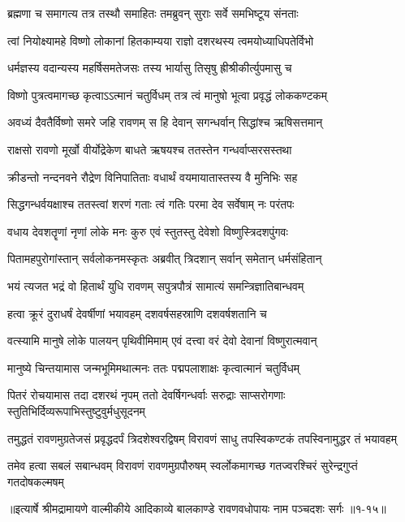 \twolineshloka
{ब्रह्मणा च समागत्य तत्र तस्थौ समाहितः}
{तमब्रुवन् सुराः सर्वे समभिष्टूय संनताः} %

\twolineshloka
{त्वां नियोक्ष्यामहे विष्णो लोकानां हितकाम्यया}
{राज्ञो दशरथस्य त्वमयोध्याधिपतेर्विभो} %

\twolineshloka
{धर्मज्ञस्य वदान्यस्य महर्षिसमतेजसः}
{तस्य भार्यासु तिसृषु ह्रीश्रीकीर्त्युपमासु च} %

\twolineshloka
{विष्णो पुत्रत्वमागच्छ कृत्वाऽऽत्मानं चतुर्विधम्}
{तत्र त्वं मानुषो भूत्वा प्रवृद्धं लोककण्टकम्} %

\twolineshloka
{अवध्यं दैवतैर्विष्णो समरे जहि रावणम्}
{स हि देवान् सगन्धर्वान् सिद्धांश्च ऋषिसत्तमान्} %

\twolineshloka
{राक्षसो रावणो मूर्खो वीर्योद्रेकेण बाधते}
{ऋषयश्च ततस्तेन गन्धर्वाप्सरसस्तथा} %

\twolineshloka
{क्रीडन्तो नन्दनवने रौद्रेण विनिपातिताः}
{वधार्थं वयमायातास्तस्य वै मुनिभिः सह} %

\twolineshloka
{सिद्धगन्धर्वयक्षाश्च ततस्त्वां शरणं गताः}
{त्वं गतिः परमा देव सर्वेषाम् नः परंतपः} %

\twolineshloka
{वधाय देवशतॄणां नृणां लोके मनः कुरु}
{एवं स्तुतस्तु देवेशो विष्णुस्त्रिदशपुंगवः} %

\twolineshloka
{पितामहपुरोगांस्तान् सर्वलोकनमस्कृतः}
{अब्रवीत् त्रिदशान् सर्वान् समेतान् धर्मसंहितान्} %

\twolineshloka
{भयं त्यजत भद्रं वो हितार्थं युधि रावणम्}
{सपुत्रपौत्रं सामात्यं समन्त्रिज्ञातिबान्धवम्} %

\twolineshloka
{हत्वा क्रूरं दुराधर्षं देवर्षीणां भयावहम्}
{दशवर्षसहस्राणि दशवर्षशतानि च} %

\twolineshloka
{वत्स्यामि मानुषे लोके पालयन् पृथिवीमिमाम्}
{एवं दत्त्वा वरं देवो देवानां विष्णुरात्मवान्} %

\twolineshloka
{मानुष्ये चिन्तयामास जन्मभूमिमथात्मनः}
{ततः पद्मपलाशाक्षः कृत्वात्मानं चतुर्विधम्} %

\threelineshloka
{पितरं रोचयामास तदा दशरथं नृपम्}
{ततो देवर्षिगन्धर्वाः सरुद्राः साप्सरोगणाः}
{स्तुतिभिर्दिव्यरूपाभिस्तुष्टुवुर्मधुसूदनम्} %

\twolineshloka
{तमुद्धतं रावणमुग्रतेजसं प्रवृद्धदर्पं त्रिदशेश्वरद्विषम्}
{विरावणं साधु तपस्विकण्टकं तपस्विनामुद्धर तं भयावहम्} %

\twolineshloka
{तमेव हत्वा सबलं सबान्धवम् विरावणं रावणमुग्रपौरुषम्}
{स्वर्लोकमागच्छ गतज्वरश्चिरं सुरेन्द्रगुप्तं गतदोषकल्मषम्} %


॥इत्यार्षे श्रीमद्रामायणे वाल्मीकीये आदिकाव्ये बालकाण्डे रावणवधोपायः नाम पञ्चदशः सर्गः ॥१-१५॥
